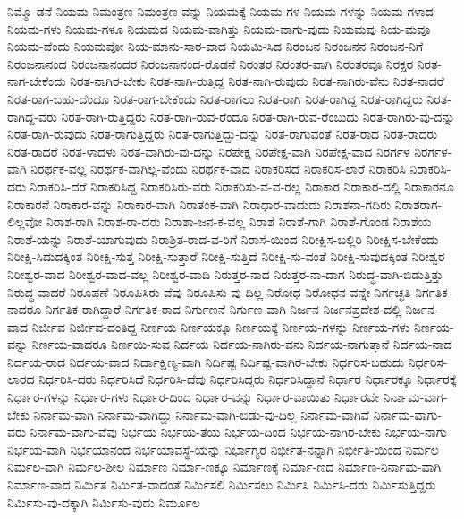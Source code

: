 {ನಿಮ್ಮೊ-ಡನೆ
ನಿಯಮ
ನಿಮಂತ್ರಣ
ನಿಮಂತ್ರಣ-ವನ್ನು
ನಿಯಮಕ್ಕೆ
ನಿಯಮ-ಗಳ
ನಿಯಮ-ಗಳನ್ನು
ನಿಯಮ-ಗಳಾದ
ನಿಯಮ-ಗಳು
ನಿಯಮ-ಗಳೂ
ನಿಯಮದ
ನಿಯಮ-ವಾಗಿತ್ತು
ನಿಯಮ-ವಾಗು-ವುದು
ನಿಯಮವು
ನಿಯ-ಮವೂ
ನಿಯಮ-ವೆಂದು
ನಿಯಮವೋ
ನಿಯ-ಮಾನು-ಸಾರ-ವಾದ
ನಿಯಮಿ-ಸಿದ
ನಿರಂಜನ
ನಿರಂಜನನ
ನಿರಂಜನ-ನಿಗೆ
ನಿರಂಜನಾನಂದ
ನಿರಂಜನಾನಂದರ
ನಿರಂಜನಾನಂದ-ರೊಡನೆ
ನಿರಂತರ
ನಿರಂತರ-ವಾಗಿ
ನಿರಂತರವೂ
ನಿರಕ್ಷರ
ನಿರತ-ನಾಗ-ಬೇಕೆಂದು
ನಿರತ-ನಾಗಿರ-ಬೇಕು
ನಿರತ-ನಾಗಿ-ರುತ್ತಿದ್ದ
ನಿರತ-ನಾಗಿ-ರುವುದು
ನಿರತ-ನಾಗಿರು-ವೆನು
ನಿರತ-ನಾದರೆ
ನಿರತ-ರಾಗ-ಬಹು-ದೆಂದೂ
ನಿರತ-ರಾಗ-ಬೇಕೆಂದು
ನಿರತ-ರಾಗಲು
ನಿರತ-ರಾಗಿ
ನಿರತ-ರಾಗಿದ್ದ
ನಿರತ-ರಾಗಿದ್ದರು
ನಿರತ-ರಾಗಿದ್ದ-ವರು
ನಿರತ-ರಾಗಿ-ರುತ್ತಿದ್ದರು
ನಿರತ-ರಾಗಿ-ರುವ-ರೆಂದೂ
ನಿರತ-ರಾಗಿ-ರುವ-ರೆಂಬುದು
ನಿರತ-ರಾಗಿರು-ವು-ದನ್ನು
ನಿರತ-ರಾಗಿ-ರುವುದು
ನಿರತ-ರಾಗುತ್ತಿದ್ದರು
ನಿರತ-ರಾಗುತ್ತಿದ್ದು-ದನ್ನು
ನಿರತ-ರಾಗುವಂತೆ
ನಿರತ-ರಾದ
ನಿರತ-ರಾದರು
ನಿರತ-ರಾದರೆ
ನಿರತ-ಳಾದಳು
ನಿರತ-ವಾಗಿರು-ವು-ದನ್ನು
ನಿರಪೇಕ್ಷ
ನಿರಪೇಕ್ಷ-ವಾಗಿ
ನಿರಪೇಕ್ಷ-ವಾದ
ನಿರರ್ಗಳ
ನಿರರ್ಗಳ-ವಾಗಿ
ನಿರರ್ಥಕ-ವಲ್ಲ
ನಿರರ್ಥಕ-ವಾಗಿಲ್ಲ-ವೆಂದು
ನಿರರ್ಥಕ-ವಾದ
ನಿರಾಕರಿಸದೆ
ನಿರಾಕರಿಸ-ಲಾರೆ
ನಿರಾಕರಿಸಿ
ನಿರಾಕರಿಸಿ-ದರು
ನಿರಾಕರಿಸಿ-ದರೆ
ನಿರಾಕರಿಸಿದ್ದ
ನಿರಾಕರಿಸಿರು-ವರು
ನಿರಾಕರಿಸು-ವ-ವ-ರಲ್ಲ
ನಿರಾಕಾರ
ನಿರಾಕಾರ-ದಲ್ಲಿ
ನಿರಾಕಾರನೂ
ನಿರಾಕಾರನೆ
ನಿರಾಕಾರ-ವನ್ನು
ನಿರಾಕಾರ-ವಾಗಿ
ನಿರಾತಂಕ-ವಾಗಿ
ನಿರಾಧಾರ-ವಾದುದು
ನಿರಾಶನಾ-ಗದಿರು
ನಿರಾಶರಾಗ-ಲಿಲ್ಲವೋ
ನಿರಾಶ-ರಾಗಿ
ನಿರಾಶ-ರಾ-ದರು
ನಿರಾಶಾ-ಜನ-ಕ-ವಲ್ಲ
ನಿರಾಶೆ
ನಿರಾಶೆ-ಗಾಗಿ
ನಿರಾಶೆ-ಗೊಂಡ
ನಿರಾಶೆಯ
ನಿರಾಶೆ-ಯನ್ನು
ನಿರಾಶೆ-ಯಾಗುವುದು
ನಿರಾಶ್ರಿತ-ರಾದ-ವ-ರಿಗೆ
ನಿರಾಸೆ-ಯಿಂದ
ನಿರೀಕ್ಷಿಸ-ಬಲ್ಲಿರಿ
ನಿರೀಕ್ಷಿಸ-ಬೇಕೆಂದು
ನಿರೀಕ್ಷಿ-ಸಿದುದಕ್ಕಿಂತ
ನಿರೀಕ್ಷಿ-ಸುತ್ತ
ನಿರೀಕ್ಷಿ-ಸುತ್ತಾರೆ
ನಿರೀಕ್ಷಿ-ಸುತ್ತಿದೆ
ನಿರೀಕ್ಷಿ-ಸು-ವಂತೆ
ನಿರೀಕ್ಷಿ-ಸುವುದಕ್ಕಿಂತ
ನಿರೀಶ್ವರ
ನಿರೀಶ್ವರ-ವಾದ
ನಿರೀಶ್ವರ-ವಾದ-ವಲ್ಲ
ನಿರೀಶ್ವರ-ವಾದಿ
ನಿರುತ್ತರ-ನಾದ
ನಿರುತ್ತರ-ನಾ-ದಾಗ
ನಿರುದ್ಧ-ವಾಗಿ-ಬಿಡುತ್ತಿತ್ತು
ನಿರುದ್ಧ-ವಾದರೆ
ನಿರೂಪಣೆ
ನಿರೂಪಿಸಿರು-ವೆವು
ನಿರೂಪಿಸು-ವು-ದಿಲ್ಲ
ನಿರೋಧ
ನಿರೋಧನ-ವನ್ನೇ
ನಿರ್ಗಚ್ಛತಿ
ನಿರ್ಗತಿಕ-ನಾದರೂ
ನಿರ್ಗತಿಕ-ರಾಗಿದ್ದಾರೆ
ನಿರ್ಗತಿಕ-ರಾದ
ನಿರ್ಗುಣನೆ
ನಿರ್ಗುಣ-ವಾಗಿ
ನಿರ್ಜನ
ನಿರ್ಜನಪ್ರದೇಶ-ದಲ್ಲಿ
ನಿರ್ಜನ-ವಾದ
ನಿರ್ಜೀವ
ನಿರ್ಜೀವ-ದಂತಿದ್ದ
ನಿರ್ಣಯ
ನಿರ್ಣಯಕ್ಕೂ
ನಿರ್ಣಯಕ್ಕೆ
ನಿರ್ಣಯ-ಗಳನ್ನು
ನಿರ್ಣಯ-ಗಳು
ನಿರ್ಣಯ-ವನ್ನು
ನಿರ್ಣಯ-ವಾದರೂ
ನಿರ್ಣಯಿ-ಸುವ
ನಿರ್ದಯ
ನಿರ್ದಯ-ನಾಗಿರು-ವನು
ನಿರ್ದಯ-ನಾಗುತ್ತಾನೆ
ನಿರ್ದಯ-ನಾದ
ನಿರ್ದಯ-ರಾದ
ನಿರ್ದಯ-ವಾದ
ನಿರ್ದಾಕ್ಷಿಣ್ಯ-ವಾಗಿ
ನಿರ್ದಿಷ್ಟ
ನಿರ್ದಿಷ್ಟ-ವಾಗಿರ-ಬೇಕು
ನಿರ್ಧರಿಸ-ಬಹುದು
ನಿರ್ಧರಿಸ-ಲಾರದ
ನಿರ್ಧರಿಸಿ-ದರು
ನಿರ್ಧರಿಸಿದೆ
ನಿರ್ಧರಿಸಿ-ದೆವು
ನಿರ್ಧರಿಸಿದ್ದರು
ನಿರ್ಧರಿಸಿದ್ದಾನೆ
ನಿರ್ಧಾರ
ನಿರ್ಧಾರಕ್ಕೂ
ನಿರ್ಧಾರಕ್ಕೆ
ನಿರ್ಧಾರ-ಗಳನ್ನು
ನಿರ್ಧಾರ-ಗಳು
ನಿರ್ಧಾರ-ದಿಂದ
ನಿರ್ಧಾರ-ವನ್ನು
ನಿರ್ಧಾರ-ವಾಯಿತು
ನಿರ್ಧಾರವೇ
ನಿರ್ನಾಮ-ವಾಗ-ಬೇಕು
ನಿರ್ನಾಮ-ವಾಗಿ
ನಿರ್ನಾಮ-ವಾಗಿದ್ದು
ನಿರ್ನಾಮ-ವಾಗಿ-ಬಿಡು-ವು-ದಿಲ್ಲ
ನಿರ್ನಾಮ-ವಾಗಿವೆ
ನಿರ್ನಾಮ-ವಾಗು-ವರು
ನಿರ್ನಾಮ-ವಾಗು-ವೆವು
ನಿರ್ಭಯ
ನಿರ್ಭಯ-ತೆಯ
ನಿರ್ಭಯ-ದಿಂದ
ನಿರ್ಭಯ-ನಾಗಿರ-ಬೇಕು
ನಿರ್ಭಯ-ನಾಗು
ನಿರ್ಭಯ-ವಾಗಿ
ನಿರ್ಭಯಾನಂದ
ನಿರ್ಭಯಾವಸ್ಥೆ-ಯನ್ನು
ನಿರ್ಭಾಗ್ಯರ
ನಿರ್ಭೀತ-ನನ್ನಾಗಿ
ನಿರ್ಭೀತಿ-ಯಿಂದ
ನಿರ್ಮಲ
ನಿರ್ಮಲ-ವಾಗಿ
ನಿರ್ಮಲ-ಶೀಲ
ನಿರ್ಮಾಣ
ನಿರ್ಮಾ-ಣಕ್ಕೂ
ನಿರ್ಮಾಣಕ್ಕೆ
ನಿರ್ಮಾ-ಣದ
ನಿರ್ಮಾಣ-ನಿರ್ನಾಮ-ವಾಗಿ
ನಿರ್ಮಾಣ-ವಾದ
ನಿರ್ಮಿತ
ನಿರ್ಮಿತ-ವಾದಂತೆ
ನಿರ್ಮಿಸಲಿ
ನಿರ್ಮಿಸಲು
ನಿರ್ಮಿಸಿ
ನಿರ್ಮಿಸಿ-ದರು
ನಿರ್ಮಿಸುತ್ತಿದ್ದರು
ನಿರ್ಮಿಸು-ವು-ದಕ್ಕಾಗಿ
ನಿರ್ಮಿಸು-ವುದು
ನಿರ್ಮೂಲ
}
